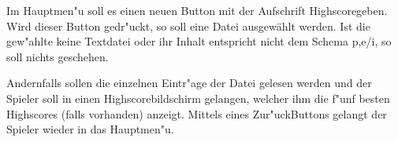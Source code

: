 Im Hauptmen"u soll es einen neuen Button mit der Aufschrift \glqq Highscore\grqq geben. 
Wird dieser Button gedr"uckt, so soll eine Datei ausgewählt werden. 
Ist die gew"ahlte keine Textdatei oder ihr Inhalt entspricht nicht dem Schema \dq p,e/i\dq, so soll nichts geschehen.

Andernfalls sollen die einzelnen Eintr"age der Datei gelesen werden und der Spieler soll in einen Highscorebildschirm gelangen, welcher ihm die f"unf besten Highscores (falls vorhanden) anzeigt.
Mittels eines \glqq Zur"uck\grqq Buttons gelangt der Spieler wieder in das Hauptmen"u.